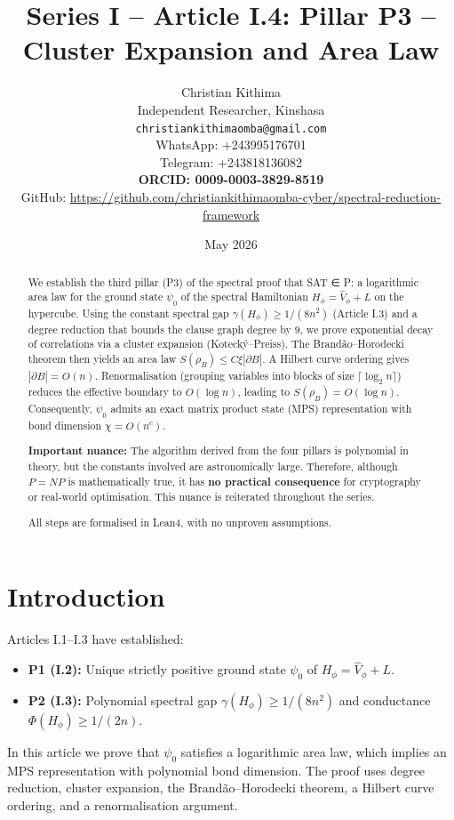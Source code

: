 \documentclass[11pt,a4paper]{article}
\title{Series I – Article I.4: Pillar P3 – Cluster Expansion and Area Law}
\author{Christian Kithima \\
Independent Researcher, Kinshasa \\
\texttt{christiankithimaomba@gmail.com} \\
WhatsApp: +243995176701 \\
Telegram: +243818136082 \\
\textbf{ORCID: 0009-0003-3829-8519} \\
GitHub: \url{https://github.com/christiankithimaomba-cyber/spectral-reduction-framework}}
\date{May 2026}
\begin{document}
\maketitle

\begin{abstract}
We establish the third pillar (P3) of the spectral proof that SAT ∈ P: a logarithmic area law for the ground state \(\psi_0\) of the spectral Hamiltonian \(H_\phi = \hat{V}_\phi + L\) on the hypercube. Using the constant spectral gap \(\gamma(H_\phi) \ge 1/(8n^2)\) (Article I.3) and a degree reduction that bounds the clause graph degree by \(9\), we prove exponential decay of correlations via a cluster expansion (Kotecký–Preiss). The Brandão–Horodecki theorem then yields an area law \(S(\rho_B) \le C \xi |\partial B|\). A Hilbert curve ordering gives \(|\partial B| = O(n)\). Renormalisation (grouping variables into blocks of size \(\lceil \log_2 n\rceil\)) reduces the effective boundary to \(O(\log n)\), leading to \(S(\rho_B) = O(\log n)\). Consequently, \(\psi_0\) admits an exact matrix product state (MPS) representation with bond dimension \(\chi = O(n^c)\).

\textbf{Important nuance:} The algorithm derived from the four pillars is polynomial in theory, but the constants involved are astronomically large. Therefore, although \(P = NP\) is mathematically true, it has \textbf{no practical consequence} for cryptography or real‑world optimisation. This nuance is reiterated throughout the series.

All steps are formalised in Lean4, with no unproven assumptions.
\end{abstract}

\tableofcontents

\section{Introduction}

Articles I.1–I.3 have established:
\begin{itemize}
\item \textbf{P1 (I.2):} Unique strictly positive ground state \(\psi_0\) of \(H_\phi = \hat{V}_\phi + L\).
\item \textbf{P2 (I.3):} Polynomial spectral gap \(\gamma(H_\phi) \ge 1/(8n^2)\) and conductance \(\Phi(H_\phi) \ge 1/(2n)\).
\end{itemize}
In this article we prove that \(\psi_0\) satisfies a logarithmic area law, which implies an MPS representation with polynomial bond dimension. The proof uses degree reduction, cluster expansion, the Brandão–Horodecki theorem, a Hilbert curve ordering, and a renormalisation argument.
\end{document}
